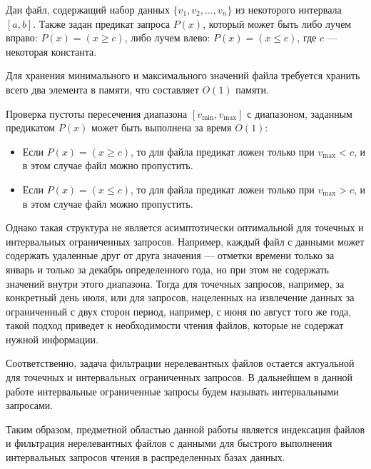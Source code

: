 Дан файл, содержащий набор данных $\{v_1, v_2, \ldots, v_n\}$ из некоторого интервала $[a, b]$. Также задан предикат запроса $P(x)$, который может быть либо лучем вправо: $P(x) = (x \geq c)$, либо лучем влево: $P(x) = (x \leq c)$, где $c$ — некоторая константа.

Для хранения минимального и максимального значений файла требуется хранить всего два элемента в памяти, что составляет $O(1)$ памяти.

Проверка пустоты пересечения диапазона $[v_{\min}, v_{\max}]$ с диапазоном, заданным предикатом $P(x)$ может быть выполнена за время $O(1)$:
\begin{itemize}
    \item Если $P(x) = (x \geq c)$, то для файла предикат ложен только при $v_{\max} < c$, и в этом случае файл можно пропустить.
    \item Если $P(x) = (x \leq c)$, то для файла предикат ложен только при $v_{\max} > c$, и в этом случае файл можно пропустить.
\end{itemize}
\thmp

Однако такая структура не является асимптотически оптимальной для точечных и интервальных ограниченных запросов. Например, каждый файл с данными может содержать удаленные друг от друга значения --- отметки времени только за январь и только за декабрь определенного года, но при этом не содержать значений внутри этого диапазона. Тогда для точечных запросов, например, за конкретный день июля, или для запросов, нацеленных на извлечение данных за ограниченный с двух сторон период, например, с июня по август того же года, такой подход приведет к необходимости чтения файлов, которые не содержат нужной информации.

Соответственно, задача фильтрации нерелевантных файлов остается актуальной для точечных и интервальных ограниченных запросов. В дальнейшем в данной работе интервальные ограниченные запросы будем называть интервальными запросами.

Таким образом, предметной областью данной работы является индексация файлов и фильтрация нерелевантных файлов с данными для быстрого выполнения интервальных запросов чтения в распределенных базах данных.

